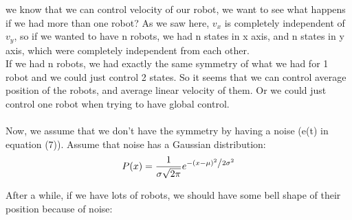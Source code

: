 \documentclass[10pt,letterpaper]{article}
\begin{document}
we know that we can control velocity of our robot, we want to see what happens if we had more than one robot? As we saw here, $v_x$ is completely independent of $v_y$, so if we wanted to have n robots, we had n states in x axis, and n states in y axis, which were completely independent from each other.\\
If we had n robots, we had exactly the same symmetry of what we had for 1 robot and we could just control 2 states. So it seems that we can control average position of the robots, and average linear velocity of them. Or we could just control one robot when trying to have global control.\\
\\
Now, we assume that we don't have the symmetry by having a noise (e(t) in equation (7)). Assume that noise has a Gaussian distribution:\\
\begin{equation}
P(x) = \frac{1}{{\sigma \sqrt {2\pi } }}e^{{{ - \left( {x - \mu } \right)^2 } \mathord{\left/ {\vphantom {{ - \left( {x - \mu } \right)^2 } {2\sigma ^2 }}} \right. \kern-\nulldelimiterspace} {2\sigma ^2 }}}
\end{equation}

After a while, if we have lots of robots, we should have some bell shape of their position because of noise:\\

\\
\end{document}
